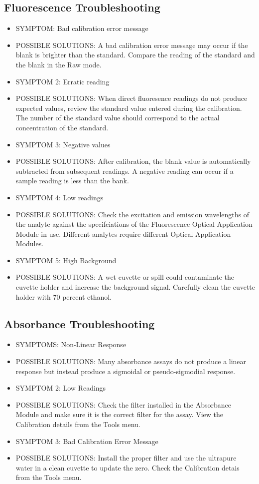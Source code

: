 \documentclass[12pt]{../SOP3_beta}\usepackage[]{graphicx}\usepackage[]{color}
\begin{document}
\subsection{Fluorescence Troubleshooting}
\begin{itemize}
  \item SYMPTOM: Bad calibration error message
  \item POSSIBLE SOLUTIONS: A bad calibration error message may occur if the blank is brighter than the standard. Compare the reading of the standard and the blank in the Raw mode. 
  \item SYMPTOM 2: Erratic reading
  \item POSSIBLE SOLUTIONS: When direct fluoresence readings do not produce expected values, review the standard value entered during the calibration. The number of the standard value should correspond to the actual concentration of the standard.
  \item SYMPTOM 3: Negative values
  \item POSSIBLE SOLUTIONS: After calibration, the blank value is automatically subtracted from subsequent readings. A negative reading can occur if a sample reading is less than the bank.
  \item SYMPTOM 4: Low readings
  \item POSSIBLE SOLUTIONS: Check the excitation and emission wavelengths of the analyte against the specifciations of the Fluorescence Optical Application Module in use. Different analytes require different Optical Application Modules.
  \item SYMPTOM 5: High Background
  \item POSSIBLE SOLUTIONS: A wet cuvette or spill could contaminate the cuvette holder and increase the background signal. Carefully clean the cuvette holder with 70 percent ethanol. 
\end{itemize}

\subsection{Absorbance Troubleshooting}
\begin{itemize}
  \item SYMPTOMS: Non-Linear Response
  \item POSSIBLE SOLUTIONS: Many absorbance assays do not produce a linear response but instead produce a sigmoidal or pseudo-sigmodial response. 
  \item SYMPTOM 2: Low Readings
  \item POSSIBLE SOLUTIONS: Check the filter installed in the Absorbance Module and make sure it is the correct filter for the assay. View the Calibration details from the Tools menu.
  \item SYMPTOM 3: Bad Calibration Error Message
  \item POSSIBLE SOLUTIONS: Install the proper filter and use the ultrapure water in a clean cuvette to update the zero. Check the Calibration detais from the Tools menu. 
\end{itemize}
\end{document}
